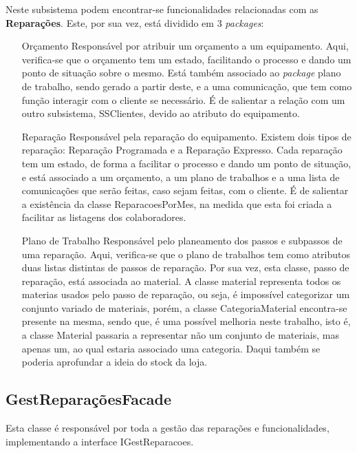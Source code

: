 \documentclass[../../relatorio.tex]{subfiles}
\begin{document}
Neste subsistema podem encontrar-se funcionalidades relacionadas com as \textbf{Reparações}. 
Este, por sua vez, está dividido em 3 \textit{packages}:
\begin{itemize}
    \item [Orçamento]{
                    Responsável por atribuir um orçamento a um equipamento. 
                    Aqui, verifica-se que o orçamento tem um estado, facilitando o processo e dando um ponto de situação sobre o mesmo. 
                    Está também associado ao \textit{package} plano de trabalho, sendo gerado a partir deste, e a uma comunicação, que tem como função 
                    interagir com o cliente se necessário.
                    É de salientar a relação com um outro subsistema, SSClientes, devido ao atributo do equipamento. 
                    }
    \item [Reparação]{
                    Responsável pela reparação do equipamento. Existem dois tipos de reparação: Reparação Programada e a Reparação Expresso. Cada reparação tem um estado, de forma 
                    a facilitar o processo e dando um ponto de situação, e está associado a um orçamento, a um plano de trabalhos e a uma lista de comunicações que serão feitas, caso sejam feitas,
                    com o cliente. É de salientar a existência da classe ReparacoesPorMes, na medida que esta foi criada a facilitar as listagens dos colaboradores.
                    } 
    \item [Plano de Trabalho]{
                    Responsável pelo planeamento dos passos e subpassos de uma reparação. 
                    Aqui, verifica-se que o plano de trabalhos tem como atributos duas listas distintas de passos de reparação. Por sua vez, esta classe, passo de reparação,
                    está associada ao material. 
                    A classe material representa todos os materias usados pelo passo de reparação, ou seja, é impossível categorizar um conjunto 
                    variado de materiais, porém, a classe CategoriaMaterial encontra-se presente na mesma, sendo que, é uma possível melhoria neste trabalho, isto é, 
                    a classe Material passaria a representar não um conjunto de materiais, mas apenas um, ao qual estaria associado uma categoria. Daqui também se poderia aprofundar
                    a ideia do stock da loja. 
                    }
\end{itemize}


\subsection{GestReparaçõesFacade}
Esta classe é responsável por toda a gestão das reparações e funcionalidades, implementando a interface IGestReparacoes.
\end{document}

